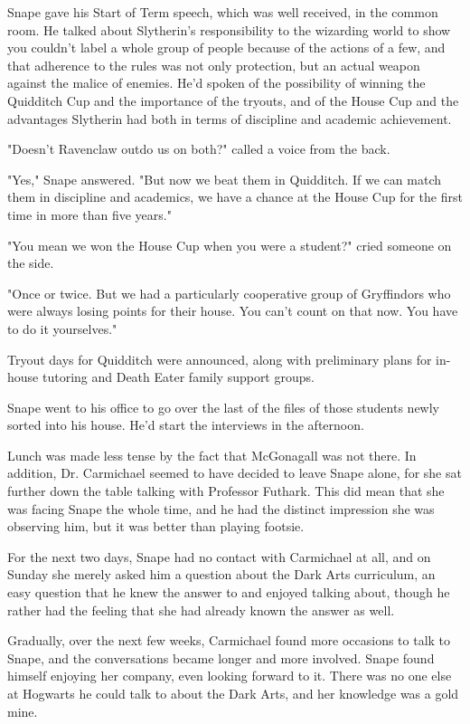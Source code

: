 Snape gave his Start of Term speech, which was well received, in the common room. He talked about Slytherin's responsibility to the wizarding world to show you couldn't label a whole group of people because of the actions of a few, and that adherence to the rules was not only protection, but an actual weapon against the malice of enemies. He'd spoken of the possibility of winning the Quidditch Cup and the importance of the tryouts, and of the House Cup and the advantages Slytherin had both in terms of discipline and academic achievement.

"Doesn't Ravenclaw outdo us on both?" called a voice from the back.

"Yes," Snape answered. "But now we beat them in Quidditch. If we can match them in discipline and academics, we have a chance at the House Cup for the first time in more than five years."

"You mean we won the House Cup when you were a student?" cried someone on the side.

"Once or twice. But we had a particularly cooperative group of Gryffindors who were always losing points for their house. You can't count on that now. You have to do it yourselves."

Tryout days for Quidditch were announced, along with preliminary plans for in-house tutoring and Death Eater family support groups.

Snape went to his office to go over the last of the files of those students newly sorted into his house. He'd start the interviews in the afternoon.

Lunch was made less tense by the fact that McGonagall was not there. In addition, Dr. Carmichael seemed to have decided to leave Snape alone, for she sat further down the table talking with Professor Futhark. This did mean that she was facing Snape the whole time, and he had the distinct impression she was observing him, but it was better than playing footsie.

For the next two days, Snape had no contact with Carmichael at all, and on Sunday she merely asked him a question about the Dark Arts curriculum, an easy question that he knew the answer to and enjoyed talking about, though he rather had the feeling that she had already known the answer as well.

Gradually, over the next few weeks, Carmichael found more occasions to talk to Snape, and the conversations became longer and more involved. Snape found himself enjoying her company, even looking forward to it. There was no one else at Hogwarts he could talk to about the Dark Arts, and her knowledge was a gold mine.


